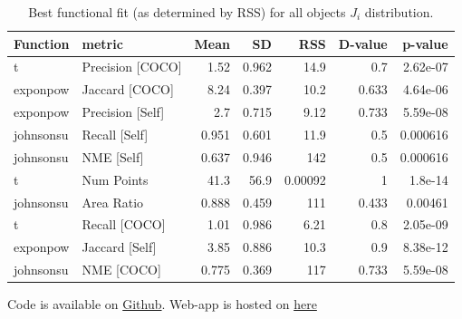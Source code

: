 \documentclass[12pt]{article}
\begin{document}
\begin{table}[ht]
\centering
\begin{tabular}{llrrrrr}
\hline
 Function   & metric           &   Mean &     SD &       RSS &   D-value &   p-value \\
\hline
 t          & Precision [COCO] &  1.52  &  0.962 &  14.9     &     0.7   &  2.62e-07 \\
 exponpow   & Jaccard [COCO]   &  8.24  &  0.397 &  10.2     &     0.633 &  4.64e-06 \\
 exponpow   & Precision [Self] &  2.7   &  0.715 &   9.12    &     0.733 &  5.59e-08 \\
 johnsonsu  & Recall [Self]    &  0.951 &  0.601 &  11.9     &     0.5   &  0.000616 \\
 johnsonsu  & NME [Self]       &  0.637 &  0.946 & 142       &     0.5   &  0.000616 \\
 t          & Num Points       & 41.3   & 56.9   &   0.00092 &     1     &  1.8e-14  \\
 johnsonsu  & Area Ratio       &  0.888 &  0.459 & 111       &     0.433 &  0.00461  \\
 t          & Recall [COCO]    &  1.01  &  0.986 &   6.21    &     0.8   &  2.05e-09 \\
 exponpow   & Jaccard [Self]   &  3.85  &  0.886 &  10.3     &     0.9   &  8.38e-12 \\
 johnsonsu  & NME [COCO]       &  0.775 &  0.369 & 117       &     0.733 &  5.59e-08 \\
\hline
\end{tabular}
\caption{Best functional fit (as determined by RSS) for all objects $J_i$ distribution.}
\label{all_Ji_fit}
\end{table}

Code is available on \href{https://github.com/dorisjlee/crowd-seg}{Github}. Web-app is hosted on \href{https://crowd-segment.herokuapp.com/segment/COCO_train2014_000000000127/12/}{here}
\end{document}
